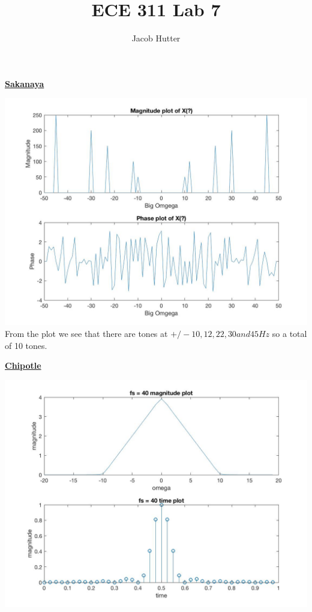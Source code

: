 \documentclass{article}
\author{Jacob Hutter}
\title{ECE 311 Lab 7}
\begin{document}
\maketitle

\color{red}
\underline{\textbf{Sakanaya}}
\color{black}


\includegraphics[scale=.5]{Sakanaya1}
From the plot we see that there are tones at $+/- 10,12,22,30 and 45 Hz$ so a total of 10 tones.




  \color{red}
  \underline{\textbf{Chipotle}}
  \color{black}

\includegraphics[scale=.5]{Chipotle1}
\end{document}
